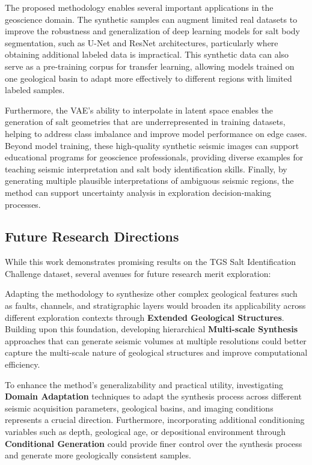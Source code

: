\documentclass{ieeeaccess}
\begin{document}
The proposed methodology enables several important applications in the geoscience domain. The synthetic samples can augment limited real datasets to improve the robustness and generalization of deep learning models for salt body segmentation, such as U-Net and ResNet architectures, particularly where obtaining additional labeled data is impractical. This synthetic data can also serve as a pre-training corpus for transfer learning, allowing models trained on one geological basin to adapt more effectively to different regions with limited labeled samples.

Furthermore, the VAE's ability to interpolate in latent space enables the generation of salt geometries that are underrepresented in training datasets, helping to address class imbalance and improve model performance on edge cases. Beyond model training, these high-quality synthetic seismic images can support educational programs for geoscience professionals, providing diverse examples for teaching seismic interpretation and salt body identification skills. Finally, by generating multiple plausible interpretations of ambiguous seismic regions, the method can support uncertainty analysis in exploration decision-making processes.


\subsection{Future Research Directions}

While this work demonstrates promising results on the TGS Salt Identification Challenge dataset, several avenues for future research merit exploration:

Adapting the methodology to synthesize other complex geological features such as faults, channels, and stratigraphic layers would broaden its applicability across different exploration contexts through \textbf{Extended Geological Structures}. Building upon this foundation, developing hierarchical \textbf{Multi-scale Synthesis} approaches that can generate seismic volumes at multiple resolutions could better capture the multi-scale nature of geological structures and improve computational efficiency.

To enhance the method's generalizability and practical utility, investigating \textbf{Domain Adaptation} techniques to adapt the synthesis process across different seismic acquisition parameters, geological basins, and imaging conditions represents a crucial direction. Furthermore, incorporating additional conditioning variables such as depth, geological age, or depositional environment through \textbf{Conditional Generation} could provide finer control over the synthesis process and generate more geologically consistent samples.
\end{document}

